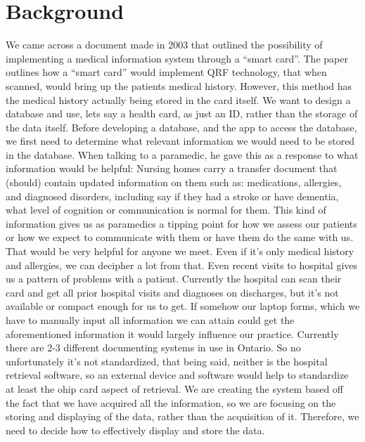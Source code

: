 
\section{Background}

We came across a document made in 2003 that outlined the possibility of implementing a medical information system through a “smart card”. The paper outlines how a “smart card” would implement QRF technology, that when scanned, would bring up the patients medical history. However, this method has the medical history actually being stored in the card itself. We want to design a database and use, lets say a health card, as just an ID, rather than the storage of the data itself.
Before developing a database, and the app to access the database, we first need to determine what relevant information we would need to be stored in the database. When talking to a paramedic, he gave this as a response to what information would be helpful:
Nursing homes carry a transfer document that (should) contain updated information on them such as: medications, allergies, and diagnosed disorders, including say if they had a stroke or have dementia, what level of cognition or communication is normal for them. This kind of information gives us as paramedics a tipping point for how we assess our patients or how we expect to communicate with them or have them do the same with us. That would be very helpful for anyone we meet. Even if it's only medical history and allergies, we can decipher a lot from that. Even recent visits to hospital gives us a pattern of problems with a patient. Currently the hospital can scan their card and get all prior hospital visits and diagnoses on discharges, but it's not available or compact enough for us to get. If somehow our laptop forms, which we have to manually input all information we can attain could get the aforementioned information it would largely influence our practice. Currently there are 2-3 different documenting systems in use in Ontario. So no unfortunately it's not standardized, that being said, neither is the hospital retrieval software, so an external device and software would help to standardize at least the ohip card aspect of retrieval.
We are creating the system based off the fact that we have acquired all the information, so we are focusing on the storing and displaying of the data, rather than the acquisition of it. Therefore, we need to decide how to effectively display and store the data.
